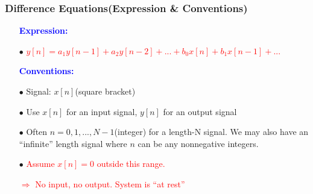 \documentclass{beamer}
\newcommand{\blue}[1]{\textcolor{blue}{#1}}
\newcommand{\red}[1]{\textcolor{red}{#1}}
\begin{document}
\begin{frame}


\frametitle{Difference Equations(Expression \& Conventions)}
\begin{itemize} \itemsep6pt \parskip0pt 
  \item[] \blue{\bf Expression:}
  \item[$\bullet$] \red{$y[n] = a_1y[n-1] + a_2y[n-2] + ... + b_0x[n] + b_1x[n-1] + ...$}
\end{itemize}

\begin{itemize} \itemsep6pt \parskip0pt 
  \item[] \blue{\large \bf Conventions:}
  \item[$\bullet$] Signal: $x[n]$(square bracket)
  \item[$\bullet$] Use $x[n]$ for an input signal, $y[n]$ for an output signal
  \item[$\bullet$] Often $n = 0,1,...,N-1$(integer) for a length-N signal. We may also have an ``infinite'' length signal where $n$ can be any nonnegative integers.
  \item[$\bullet$] \red{Assume $x[n] = 0$ outside this range.}
  \item[] \red{$\Rightarrow$ No input, no output. System is ``at rest''}
\end{itemize}


\end{frame}


\end{document}
